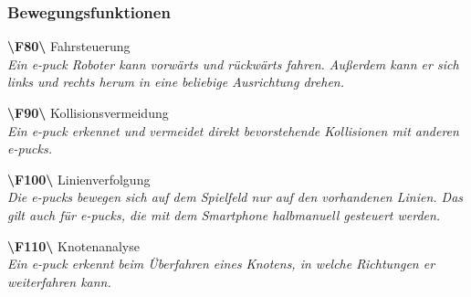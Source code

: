 \documentclass[10pt,a4paper]{article}
\begin{document}
			\subsubsection{Bewegungsfunktionen}
				\begin{list}{}{\leftmargin=1cm}
					\item[\textbf{\textbackslash F80\textbackslash}] Fahrsteuerung
						\\ \textsl{Ein e-puck Roboter kann vorwärts und rückwärts fahren. Außerdem kann er sich links und rechts herum
						in eine beliebige Ausrichtung drehen.}
					\item[\textbf{\textbackslash F90\textbackslash}] Kollisionsvermeidung
						\\ \textsl{Ein e-puck erkennet und vermeidet direkt bevorstehende Kollisionen mit anderen e-pucks.}
					\item[\textbf{\textbackslash F100\textbackslash}] Linienverfolgung
						\\ \textsl{Die e-pucks bewegen sich auf dem Spielfeld nur auf den vorhandenen Linien. Das gilt auch für e-pucks,
						die mit dem Smartphone halbmanuell gesteuert werden.}
					\item[\textbf{\textbackslash F110\textbackslash}] Knotenanalyse
						\\ \textsl{Ein e-puck erkennt beim Überfahren eines Knotens, in welche Richtungen er weiterfahren kann.}
				\end{list}
\end{document}
